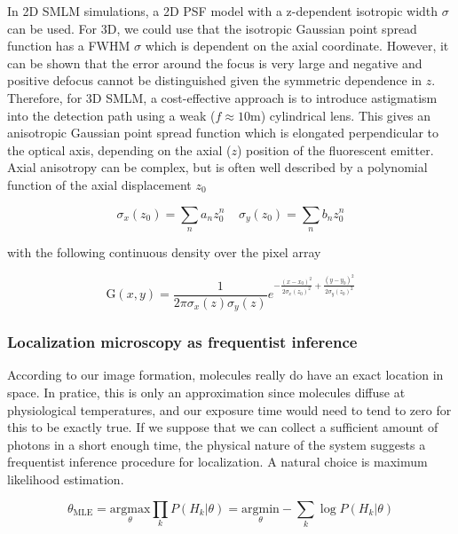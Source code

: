 \documentclass{ucetd}
\begin{document}
In 2D SMLM simulations, a 2D PSF  model  with  a z-dependent  isotropic  width $\sigma$ can  be  used. For 3D, we could use that the isotropic Gaussian point spread function has a FWHM $\sigma$ which is dependent on the axial coordinate. However, it can be shown that the error around the focus is very large and negative and positive defocus cannot be distinguished given the symmetric dependence in $z$.  Therefore, for 3D SMLM, a cost-effective approach is to introduce astigmatism into the detection path using a weak ($f\approx 10\mathrm{m}$) cylindrical lens. This gives an anisotropic Gaussian point spread function which is elongated perpendicular to the optical axis, depending on the axial ($z$) position of the fluorescent emitter. Axial anisotropy can be complex, but is often well described by a polynomial function of the axial displacement $z_{0}$

\begin{equation*}
\sigma_{x}(z_{0}) = \sum_{n}a_{n}z_{0}^{n}\;\;\;\; \sigma_{y}(z_{0}) = \sum_{n}b_{n}z_{0}^{n}
\end{equation*}

with the following continuous density over the pixel array

\begin{equation}
\mathrm{G}(x,y) = \frac{1}{2\pi\sigma_{x}(z)\sigma_{y}(z)}e^{-\frac{(x-x_{0})^{2}}{2\sigma_{x}(z_{0})^{2}}+\frac{(y-y_{0})^{2}}{2\sigma_{y}(z_{0})^{2}}}
\end{equation}


\subsubsection{Localization microscopy as frequentist inference}

According to our image formation, molecules really do have an exact location in space. In pratice, this is only an approximation since molecules diffuse at physiological temperatures, and our exposure time would need to tend to zero for this to be exactly true. If we suppose that we can collect a sufficient amount of photons in a short enough time, the physical nature of the system suggests a frequentist inference procedure for localization. A natural choice is maximum likelihood estimation. 

\begin{equation*}
\theta_{\mathrm{MLE}} = \underset{\theta}{\mathrm{argmax}}\prod_{k}P(H_{k}|\theta)= \underset{\theta}{\mathrm{argmin}}-\sum_{k}\log P(H_{k}|\theta)
\end{equation*}
\end{document}
